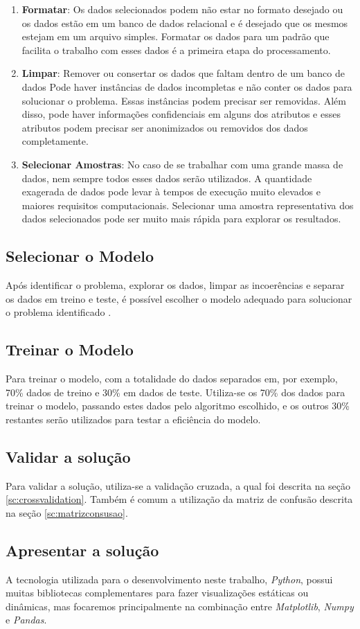 \begin{enumerate}
	\item \textbf{Formatar}: Os dados selecionados podem não estar no formato desejado ou os dados estão em um banco de dados relacional e é desejado que os mesmos estejam em um arquivo simples. Formatar os dados para um padrão que facilita o trabalho com esses dados é a primeira etapa do processamento.
	\item \textbf{Limpar}: Remover ou consertar os dados que faltam dentro de um banco de dados  Pode haver instâncias de dados incompletas e não conter os dados para solucionar o problema. Essas instâncias podem precisar ser removidas. Além disso, pode haver informações confidenciais em alguns dos atributos e esses atributos podem precisar ser anonimizados ou removidos dos dados completamente.
	\item \textbf{Selecionar Amostras}: No caso de se trabalhar com uma grande massa de dados, nem sempre todos esses dados serão utilizados. A quantidade exagerada de dados pode levar à tempos de execução muito elevados e maiores requisitos computacionais. Selecionar uma amostra representativa dos dados selecionados pode ser muito mais rápida para explorar os resultados.
\end{enumerate}

\subsection{Selecionar o Modelo}
Após identificar o problema, explorar os dados, limpar as incoerências e separar os dados em treino e teste, é possível escolher o modelo adequado para solucionar o problema identificado \cite{geron2017hands}.

\subsection{Treinar o Modelo}
Para treinar o modelo, com a totalidade do dados separados em, por exemplo, 70\% dados de treino e 30\% em dados de teste. Utiliza-se os 70\% dos dados para treinar o modelo, passando estes dados pelo algoritmo escolhido, e os outros 30\% restantes serão utilizados para testar a eficiência do modelo.

\subsection{Validar a solução}
Para validar a solução, utiliza-se a validação cruzada, a qual foi descrita na seção \ref{sc:crossvalidation}. Também é comum a utilização da matriz de confusão descrita na seção \ref{sc:matrizconsusao}.

\subsection{Apresentar a solução}
A tecnologia utilizada para o desenvolvimento neste trabalho, \textit{Python}, possui muitas bibliotecas complementares para fazer visualizações estáticas ou dinâmicas, mas focaremos principalmente na combinação entre \textit{Matplotlib}, \textit{Numpy} e \textit{Pandas}.
